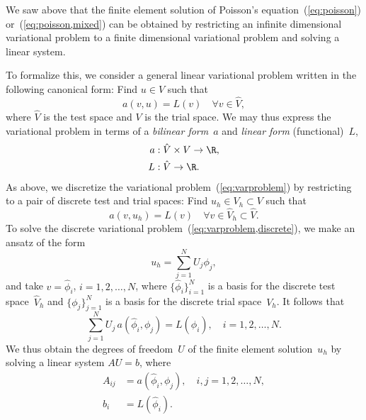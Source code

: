 We saw above that the finite element solution of Poisson's
equation~(\ref{eq:poisson}) or~(\ref{eq:poisson,mixed}) can be
obtained by restricting an infinite dimensional variational problem to
a finite dimensional variational problem and solving a linear system.

To formalize this, we consider a general linear variational problem
written in the following canonical form: Find $u \in V$ such that
\begin{equation} \label{eq:varproblem}
  a(v, u) = L(v) \quad \forall v \in \hat{V},
\end{equation}
where $\hat{V}$ is the test space and $V$ is the trial space. We may thus
express the variational problem in terms of a \emph{bilinear form}~$a$
and \emph{linear form} (functional)~$L$,
\begin{displaymath}
  \begin{split}
    a &: \hat{V} \times V \rightarrow \R, \\
    L &: \hat{V} \rightarrow \R.
  \end{split}
\end{displaymath}
As above, we discretize the variational problem~(\ref{eq:varproblem})
by restricting to a pair of discrete test and trial spaces: Find $u_h
\in V_h \subset V$ such that
\begin{equation} \label{eq:varproblem,discrete}
  a(v, u_h) = L(v) \quad \forall v \in \hat{V}_h \subset \hat{V}.
\end{equation}
To solve the discrete variational
problem~(\ref{eq:varproblem,discrete}), we make an ansatz of the form
\begin{equation} \label{eq:ansatz}
  u_h = \sum_{j=1}^N U_j \phi_j,
\end{equation}
and take $v = \hat{\phi}_i$, $i = 1,2,\ldots,N$, where
$\{\hat{\phi}_i\}_{i=1}^N$ is a basis for the discrete test
space~$\hat{V}_h$ and $\{\phi_j\}_{j=1}^N$ is a basis for the discrete
trial space~$V_h$. It follows that
\begin{displaymath}
  \sum_{j=1}^N U_j \, a(\hat{\phi}_i, \phi_j) = L(\hat{\phi}_i), \quad i
  = 1,2,\ldots,N.
\end{displaymath}
We thus obtain the degrees of freedom~$U$ of the
finite element solution~$u_h$ by solving a linear system $AU = b$,
where
\begin{equation} \label{eq:system}
  \begin{split}
    A_{ij} &= a(\hat{\phi}_i, \phi_j), \quad i, j = 1,2,\ldots,N, \\
    b_i &= L(\hat{\phi}_i).
  \end{split}
\end{equation}

